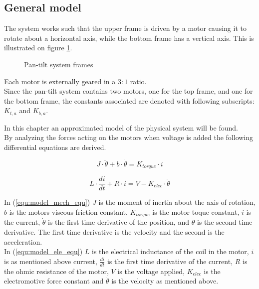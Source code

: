 \documentclass[../../main]{subfiles}
\begin{document}
\subsection{General model}
\label{ch:General_model}
The system works such that the upper frame is driven by a motor causing it to rotate about a horizontal axis, while the bottom frame has a vertical axis. This is illustrated on figure \ref{fig:pan-tilt_frames}.

  \begin{figure}[H]
    \centering
  \def\svgwidth{0.4\columnwidth}
  \qquad
  \def\svgwidth{0.2\columnwidth}
  \caption{Pan-tilt system frames}
  \label{fig:pan-tilt_frames}
  \end{figure}

Each motor is externally geared in a $3:1$ ratio.\\
Since the pan-tilt system contains two motors, one for the top frame, and one for the bottom frame, the constants associated are denoted with following subscripts: $K_{t,a}$ and $K_{b,a}$.

In this chapter an approximated model of the physical system will be found.\\

By analyzing the forces acting on the motors when voltage is added the following differential equations are derived.

\begin{equation}
  \label{equ:model_mech_equ}
  J\cdot \ddot \theta + b\cdot \dot \theta = K_{torque}\cdot i
\end{equation}

\begin{equation}
  \label{equ:model_ele_equ}
  L\cdot \frac{di}{dt} + R\cdot i = V - K_{elec}\cdot \dot \theta
\end{equation}

In (\ref{equ:model_mech_equ}) $J$ is the moment of inertia about the axis of rotation, $b$ is the motors viscous friction constant, $K_{torque}$ is the motor toque constant, $i$ is the current, $\dot \theta$ is the first time derivative of the position, and $\ddot \theta$ is the second time derivative. The first time derivative is the velocity and the second is the acceleration.\\
In (\ref{equ:model_ele_equ}) $L$ is the electrical inductance of the coil in the motor, $i$ is as mentioned above current, $\frac{di}{dt}$ is the first time derivative of the current, $R$ is the ohmic resistance of the motor, $V$ is the voltage applied, $K_{elec}$ is the electromotive force constant and $\dot \theta$ is the velocity as mentioned above.\\
\end{document}
